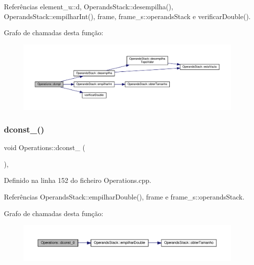 Referências element\+\_\+u\+::d, Operands\+Stack\+::desempilha(), Operands\+Stack\+::empilhar\+Int(), frame, frame\+\_\+s\+::operands\+Stack e verificar\+Double().

Grafo de chamadas desta função\+:\nopagebreak
\begin{figure}[H]
\begin{center}
\leavevmode
\includegraphics[width=350pt]{classOperations_a89e1792d8c650c2274352c534cfbd7c0_cgraph}
\end{center}
\end{figure}
\mbox{\label{classOperations_abd7f711342c43f7fa4e93b41931e6c86}} 
\subsubsection{\texorpdfstring{dconst\+\_()}{dconst\_0()}}
{\footnotesize\ttfamily void Operations\+::dconst\+\_ (\begin{DoxyParamCaption}{ }\end{DoxyParamCaption})\hspace{0.3cm}{\ttfamily [static]}, {\ttfamily [private]}}



Definido na linha 152 do ficheiro Operations.\+cpp.



Referências Operands\+Stack\+::empilhar\+Double(), frame e frame\+\_\+s\+::operands\+Stack.

Grafo de chamadas desta função\+:\nopagebreak
\begin{figure}[H]
\begin{center}
\leavevmode
\includegraphics[width=350pt]{classOperations_abd7f711342c43f7fa4e93b41931e6c86_cgraph}
\end{center}
\end{figure}
\mbox{\label{classOperations_a1a704891f81e3b532bf0eaad94429773}} 
